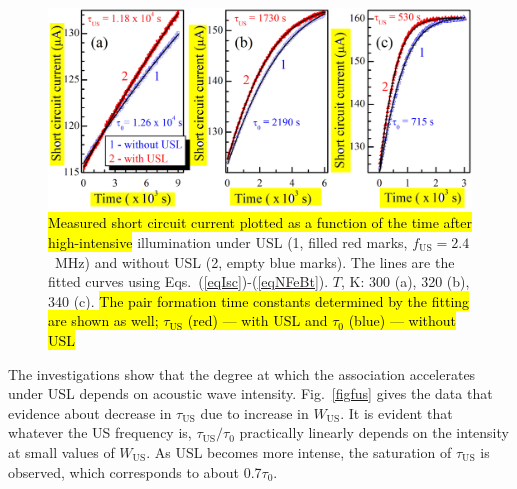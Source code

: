\documentclass[sn-mathphys]{sn-jnl}%
\theoremstyle{thmstyleone}%
\theoremstyle{thmstyletwo}%
\theoremstyle{thmstylethree}%
\begin{document}
\begin{figure}
\centering
 \includegraphics[width=1.0\textwidth]{Fig3}
\caption{
\hl{Measured short circuit current plotted as a function of the time after high-intensive} illumination
under USL (1, filled red marks, $f_\mathrm{US} = 2.4$~MHz) and without USL (2, empty blue marks).
The lines are the fitted curves using Eqs.~(\ref{eqIsc})-(\ref{eqNFeBt}).
$T$, K: 300 (a), 320 (b), 340 (c).
\hl{The pair formation time constants determined by the fitting are shown as well;
$\tau_\mathrm{US}$ (red) --- with USL and $\tau_{0}$ (blue) --- without USL}
}
\label{figIscUs}       %
\end{figure}

The investigations show that the degree at which the association accelerates
under USL depends on acoustic wave intensity.
Fig.~\ref{figfus} gives the data that evidence about decrease
in $\tau_\mathrm{US}$ due to increase in $W_\mathrm{US}$.
It is evident that whatever the US frequency is, $\tau_\mathrm{US}/\tau_{0}$
practically linearly depends on the intensity at small values of $W_\mathrm{US}$.
As USL becomes more intense, the saturation of $\tau_\mathrm{US}$ is observed,
which corresponds to about 0.7$\tau_{0}$.
\end{document}
